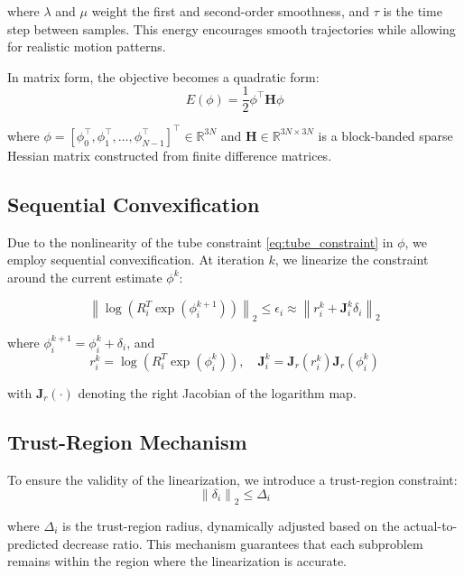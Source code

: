 where $\lambda$ and $\mu$ weight the first and second-order smoothness, and $\tau$ is the time step between samples. This energy encourages smooth trajectories while allowing for realistic motion patterns.

In matrix form, the objective becomes a quadratic form:
\begin{equation}
\label{eq:quadratic}
E(\phi) = \frac{1}{2}\phi^\top \mathbf{H}\phi
\end{equation}

where $\phi = [\phi_0^\top, \phi_1^\top, \ldots, \phi_{N-1}^\top]^\top \in \mathbb{R}^{3N}$ and $\mathbf{H} \in \mathbb{R}^{3N \times 3N}$ is a block-banded sparse Hessian matrix constructed from finite difference matrices.

\subsection{Sequential Convexification}

Due to the nonlinearity of the tube constraint \eqref{eq:tube_constraint} in $\phi$, we employ sequential convexification. At iteration $k$, we linearize the constraint around the current estimate $\phi^k$:

\begin{equation}
\label{eq:linearized_constraint}
\left\| \log\left(R_i^T \exp(\phi_i^{k+1})\right) \right\|_2 \leq \epsilon_i \approx \left\| r_i^k + \mathbf{J}_i^k \delta_i \right\|_2
\end{equation}

where $\phi_i^{k+1} = \phi_i^k + \delta_i$, and
\begin{equation}
r_i^k = \log\left(R_i^T \exp(\phi_i^k)\right), \quad \mathbf{J}_i^k = \mathbf{J}_r(r_i^k) \mathbf{J}_r(\phi_i^k)
\end{equation}

with $\mathbf{J}_r(\cdot)$ denoting the right Jacobian of the logarithm map.

\subsection{Trust-Region Mechanism}

To ensure the validity of the linearization, we introduce a trust-region constraint:
\begin{equation}
\label{eq:trust_region}
\left\| \delta_i \right\|_2 \leq \Delta_i
\end{equation}

where $\Delta_i$ is the trust-region radius, dynamically adjusted based on the actual-to-predicted decrease ratio. This mechanism guarantees that each subproblem remains within the region where the linearization is accurate.

